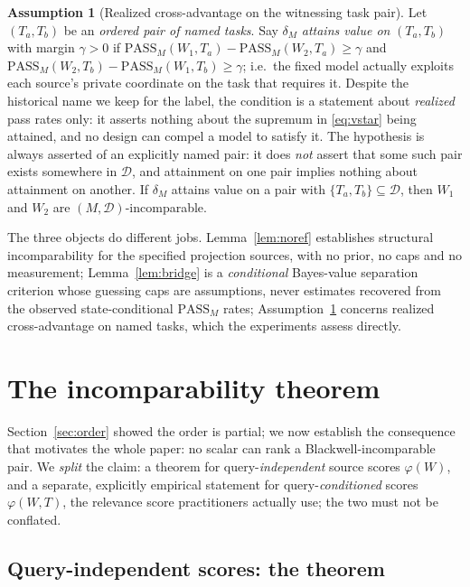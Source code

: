 \documentclass[11pt]{article}
\theoremstyle{plain}
\theoremstyle{definition}
\newtheorem{assumption}{Assumption}
\theoremstyle{remark}
\newcommand{\PASS}{\mathrm{PASS}}
\newcommand{\Dcal}{\mathcal{D}}
\begin{document}
\begin{assumption}[Realized cross-advantage on the witnessing task pair]
\label{ass:attain}
Let $(T_a,T_b)$ be an \emph{ordered pair of named tasks}. Say $\delta_M$ \emph{attains value on}
$(T_a,T_b)$ with margin $\gamma>0$ if
$\PASS_M(W_1,T_a) - \PASS_M(W_2,T_a) \ge \gamma$ and
$\PASS_M(W_2,T_b) - \PASS_M(W_1,T_b) \ge \gamma$; i.e.\ the fixed model actually exploits each
source's private coordinate on the task that requires it. Despite the historical name we keep for
the label, the condition is a statement about \emph{realized} pass rates only: it asserts nothing
about the supremum in \eqref{eq:vstar} being attained, and no design can compel a model to satisfy
it. The hypothesis is always asserted of an
explicitly named pair: it does \emph{not} assert that some such pair exists somewhere in $\Dcal$,
and attainment on one pair implies nothing about attainment on another. If $\delta_M$ attains
value on a pair with $\{T_a,T_b\}\subseteq \Dcal$, then $W_1$ and $W_2$ are
$(M,\Dcal)$-incomparable.
\end{assumption}

The three objects do different jobs. Lemma~\ref{lem:noref} establishes structural incomparability
for the specified projection sources, with no prior, no caps and no measurement;
Lemma~\ref{lem:bridge} is a \emph{conditional} Bayes-value separation criterion whose guessing caps
are assumptions, never estimates recovered from the observed state-conditional $\PASS_M$ rates;
Assumption~\ref{ass:attain} concerns realized cross-advantage on named tasks, which the
experiments assess directly.

\section{The incomparability theorem}
\label{sec:incomparability}

Section~\ref{sec:order} showed the order is partial; we now establish the consequence that motivates the
whole paper: no scalar can rank a Blackwell-incomparable pair. We \emph{split} the claim: a theorem
for query-\emph{independent} source scores $\varphi(W)$, and a separate, explicitly empirical
statement for query-\emph{conditioned} scores $\varphi(W,T)$, the relevance score practitioners
actually use; the two must not be conflated.

\subsection{Query-independent scores: the theorem}
\end{document}
